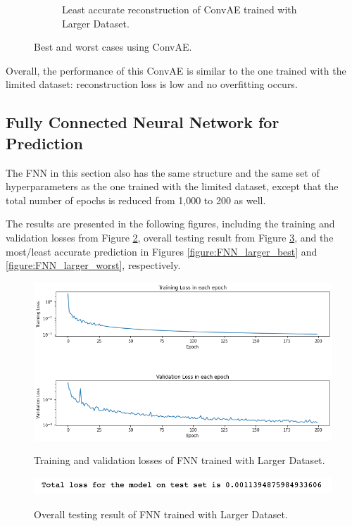 \begin{figure}[H]
\begin{subfigure}{0.45\textwidth}
    \caption{Least accurate reconstruction of ConvAE trained with Larger Dataset.}
\end{subfigure}   
\caption{Best and worst cases using ConvAE.}
\label{figure:ConvAE_larger_best_worst}
\end{figure}

Overall, the performance of this ConvAE is similar to the one trained with the limited dataset: reconstruction loss is low and no overfitting occurs.


\subsection{Fully Connected Neural Network for Prediction}

The FNN in this section also has the same structure and the same set of hyperparameters as the one trained with the limited dataset, except that the total number of epochs is reduced from 1,000 to 200 as well.

The results are presented in the following figures, including the training and validation losses from Figure \ref{figure:FNN_larger_losses}, overall testing result from Figure \ref{figure:FNN_larger_testing}, and the most/least accurate prediction in Figures \ref{figure:FNN_larger_best} and \ref{figure:FNN_larger_worst}, respectively.

\begin{figure}[H]
    \caption{Training and validation losses of FNN trained with Larger Dataset.}
    \includegraphics[scale=0.6]{figures/mantle_convection_images/larger_dataset/FNN_trainingData.png}
    \label{figure:FNN_larger_losses}
\end{figure}

\begin{figure}[H]
    \caption{Overall testing result of FNN trained with Larger Dataset.}
    \includegraphics[scale=0.8]{figures/mantle_convection_images/larger_dataset/FNN_OverallTesting.png}
    \label{figure:FNN_larger_testing}
\end{figure}


